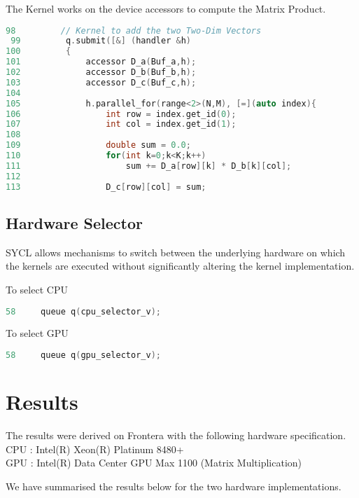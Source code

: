 \documentclass[14pt,fleqn]{article}
\begin{document}
The Kernel works on the device accessors to compute the Matrix Product.
\begin{lstlisting}[language=C++]
 98         // Kernel to add the two Two-Dim Vectors
 99         q.submit([&] (handler &h)
100         {
101             accessor D_a(Buf_a,h);
102             accessor D_b(Buf_b,h);
103             accessor D_c(Buf_c,h);
104
105             h.parallel_for(range<2>(N,M), [=](auto index){
106                 int row = index.get_id(0);
107                 int col = index.get_id(1);
108
109                 double sum = 0.0;
110                 for(int k=0;k<K;k++)
111                     sum += D_a[row][k] * D_b[k][col];
112
113                 D_c[row][col] = sum;
\end{lstlisting}

\subsection{Hardware Selector}
SYCL allows mechanisms to switch between the underlying hardware on which the kernels are executed without significantly altering the kernel implementation.

To select CPU
\begin{lstlisting}[language=C++]
 58     queue q(cpu_selector_v);
\end{lstlisting}

To select GPU
\begin{lstlisting}[language=C++]
 58     queue q(gpu_selector_v);
\end{lstlisting}

\vspace{10pt}

\section{Results}
The results were derived on Frontera with the following hardware specification.\\
CPU : Intel(R) Xeon(R) Platinum 8480+ \\
GPU : Intel(R) Data Center GPU Max 1100 (Matrix Multiplication)

We have summarised the results below for the two hardware implementations.
\end{document}
